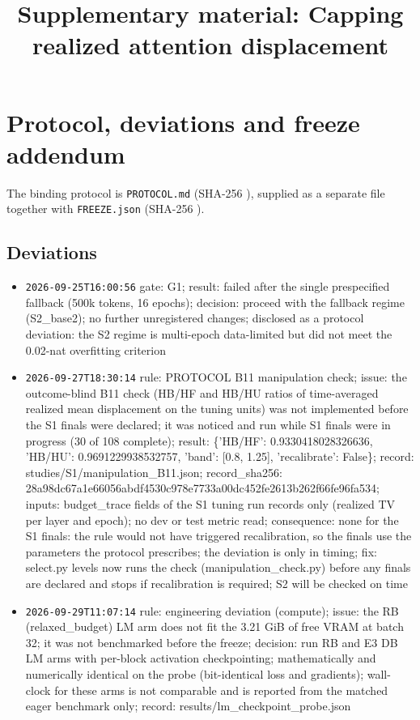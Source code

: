 \documentclass[11pt]{article}
\title{Supplementary material: Capping realized attention displacement}
\date{}
\begin{document}
\maketitle
\sloppy\raggedright\small
\section{Protocol, deviations and freeze addendum}
The binding protocol is \texttt{PROTOCOL.md} (SHA-256 \texttt{}), supplied as a separate file together with \texttt{FREEZE.json} (SHA-256 \texttt{}).
\subsection{Deviations}\begin{itemize}
\item \texttt{2026-09-25T16:00:56} gate: G1; result: failed after the single prespecified fallback (500k tokens, 16 epochs); decision: proceed with the fallback regime (S2\_base2); no further unregistered changes; disclosed as a protocol deviation: the S2 regime is multi-epoch data-limited but did not meet the 0.02-nat overfitting criterion
\item \texttt{2026-09-27T18:30:14} rule: PROTOCOL B11 manipulation check; issue: the outcome-blind B11 check (HB/HF and HB/HU ratios of time-averaged realized mean displacement on the tuning units) was not implemented before the S1 finals were declared; it was noticed and run while S1 finals were in progress (30 of 108 complete); result: \{'HB/HF': 0.9330418028326636, 'HB/HU': 0.9691229938532757, 'band': [0.8, 1.25], 'recalibrate': False\}; record: studies/S1/manipulation\_B11.json; record\_sha256: 28a98dc67a1e66056abdf4530c978e7733a00dc452fe2613b262f66fe96fa534; inputs: budget\_trace fields of the S1 tuning run records only (realized TV per layer and epoch); no dev or test metric read; consequence: none for the S1 finals: the rule would not have triggered recalibration, so the finals use the parameters the protocol prescribes; the deviation is only in timing; fix: select.py levels now runs the check (manipulation\_check.py) before any finals are declared and stops if recalibration is required; S2 will be checked on time
\item \texttt{2026-09-29T11:07:14} rule: engineering deviation (compute); issue: the RB (relaxed\_budget) LM arm does not fit the 3.21 GiB of free VRAM at batch 32; it was not benchmarked before the freeze; decision: run RB and E3 DB LM arms with per-block activation checkpointing; mathematically and numerically identical on the probe (bit-identical loss and gradients); wall-clock for these arms is not comparable and is reported from the matched eager benchmark only; record: results/lm\_checkpoint\_probe.json

\end{itemize}
\end{document}
